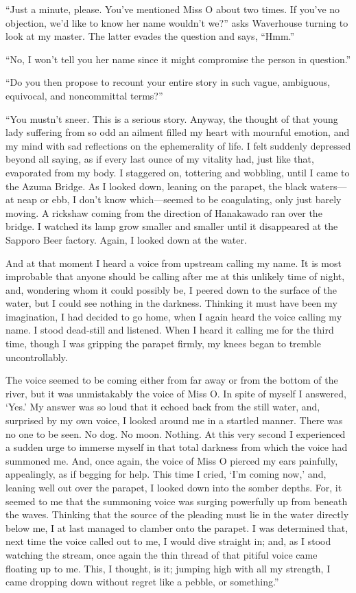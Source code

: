 \documentclass{book}
\begin{document}
``Just a minute, please. You've mentioned Miss O about two times. If
you've no objection, we'd like to know her name wouldn't we?'' asks
Waverhouse turning to look at my master. The latter evades the question
and says, ``Hmm.''

``No, I won't tell you her name since it might compromise the person in
question.''

``Do you then propose to recount your entire story in such vague,
ambiguous, equivocal, and noncommittal terms?''

``You mustn't sneer. This is a serious story. Anyway, the thought of
that young lady suffering from so odd an ailment filled my heart with
mournful emotion, and my mind with sad reflections on the ephemerality
of life. I felt suddenly depressed beyond all saying, as if every last
ounce of my vitality had, just like that, evaporated from my body. I
staggered on, tottering and wobbling, until I came to the Azuma Bridge.
As I looked down, leaning on the parapet, the black waters---at neap or
ebb, I don't know which---seemed to be coagulating, only just barely
moving. A rickshaw coming from the direction of Hanakawado ran over the
bridge. I watched its lamp grow smaller and smaller until it disappeared
at the Sapporo Beer factory. Again, I looked down at the water.

And at that moment I heard a voice from upstream calling my name. It is
most improbable that anyone should be calling after me at this unlikely
time of night, and, wondering whom it could possibly be, I peered down
to the surface of the water, but I could see nothing in the darkness.
Thinking it must have been my imagination, I had decided to go home,
when I again heard the voice calling my name. I stood dead-still and
listened. When I heard it calling me for the third time, though I was
gripping the parapet firmly, my knees began to tremble uncontrollably.

The voice seemed to be coming either from far away or from the bottom of
the river, but it was unmistakably the voice of Miss O. In spite of
myself I answered, `Yes.' My answer was so loud that it echoed back from
the still water, and, surprised by my own voice, I looked around me in a
startled manner. There was no one to be seen. No dog. No moon. Nothing.
At this very second I experienced a sudden urge to immerse myself in
that total darkness from which the voice had summoned me. And, once
again, the voice of Miss O pierced my ears painfully, appealingly, as if
begging for help. This time I cried, `I'm coming now,' and, leaning well
out over the parapet, I looked down into the somber depths. For, it
seemed to me that the summoning voice was surging powerfully up from
beneath the waves. Thinking that the source of the pleading must lie in
the water directly below me, I at last managed to clamber onto the
parapet. I was determined that, next time the voice called out to me, I
would dive straight in; and, as I stood watching the stream, once again
the thin thread of that pitiful voice came floating up to me. This, I
thought, is it; jumping high with all my strength, I came dropping down
without regret like a pebble, or something.''
\end{document}
